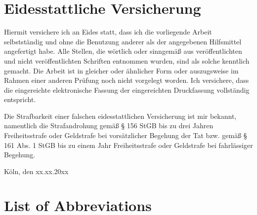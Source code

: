 \documentclass[a4paper, twoside, 12pt]{article}
\begin{document}
\section*{Eidesstattliche Versicherung}
\label{sec:SOOA}

\vspace{2.5cm}


Hiermit versichere ich an Eides statt, dass ich die vorliegende Arbeit selbstständig und ohne die Benutzung anderer als der angegebenen Hilfsmittel angefertigt habe. Alle Stellen, die wörtlich oder sinngemäß aus veröffentlichten und nicht veröffentlichten Schriften entnommen wurden, sind als solche kenntlich gemacht. Die Arbeit ist in gleicher oder ähnlicher Form oder auszugsweise im Rahmen einer anderen Prüfung noch nicht vorgelegt worden. Ich versichere, dass die eingereichte elektronische Fassung der eingereichten Druckfassung vollständig entspricht.

\vspace{1cm}

\noindent
Die Strafbarkeit einer falschen eidesstattlichen Versicherung ist mir bekannt, namentlich die Strafandrohung gemäß § 156 StGB bis zu drei Jahren Freiheitsstrafe oder Geldstrafe bei vorsätzlicher Begehung der Tat bzw. gemäß § 161 Abs. 1 StGB bis zu einem Jahr Freiheitsstrafe oder Geldstrafe bei fahrlässiger Begehung.

\vspace{3cm}
\noindent
\textbf{\@author{}}

\vspace{0.5cm}
\noindent
Köln, den xx.xx.20xx
\clearpage

\setcounter{page}{1}
\tableofcontents
\clearpage
\listoffigures
\clearpage
\listoftables
\clearpage

\section*{List of Abbreviations} 
\begin{acronym}[GCRM]
\end{acronym}
\clearpage
\end{document}
